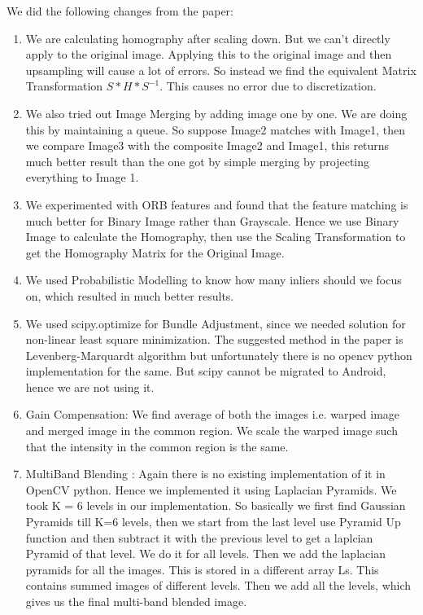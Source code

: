 \documentclass{article}
\begin{document}
We did the following changes from the paper:

\begin{enumerate}

\item We are calculating homography after scaling down. But we can’t directly apply to the original image. Applying this to the original image and then upsampling will cause a lot of errors. So instead we find the equivalent Matrix Transformation $S * H * S^{-1}$. This causes no error due to discretization.

\item We also tried out Image Merging by adding image one by one. We are doing this by maintaining a queue. So suppose Image2 matches with Image1, then we  compare Image3 with the composite Image2 and Image1, this returns much better result than the one got by simple merging by projecting everything to Image 1.

\item We experimented with ORB features and found that the feature matching is much better for Binary Image rather than Grayscale. Hence we use Binary Image to calculate the Homography, then use the Scaling Transformation to get the Homography Matrix for the Original Image.

\item We used Probabilistic Modelling to know how many inliers should we focus on, which resulted in much better results.
 
\item We used scipy.optimize for Bundle Adjustment, since we needed solution for non-linear least square minimization. The suggested method in the paper is Levenberg-Marquardt algorithm but unfortunately there is no opencv python implementation for the same. But scipy cannot be migrated to Android, hence we are not using it.

\item Gain Compensation: We find average of both the images i.e. warped image and merged image in the common region. We scale the warped image such that the intensity in the common region is the same.
 
\item MultiBand Blending : Again there is no existing implementation of it in OpenCV python. Hence we implemented it using Laplacian Pyramids. We took K = 6 levels in our implementation. So basically we first find Gaussian Pyramids till K=6 levels, then we start from the last level use Pyramid Up function and then subtract it with the previous level to get a laplcian Pyramid of that level. We do it for all levels. Then we add the laplacian pyramids for all the images. This is stored in a different array Ls. This contains summed images of different levels. Then we add all the levels, which gives us the final multi-band blended image.
\end{enumerate}
\end{document}
